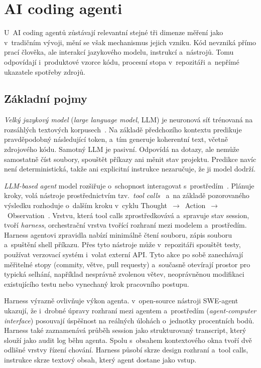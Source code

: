 \section{AI coding agenti}
\label{sec:ai-coding-agenti}

U~AI coding agentů zůstávají relevantní stejné tři dimenze měření jako
v~tradičním vývoji, mění se však mechanismus jejich vzniku. Kód nevzniká
přímo prací člověka, ale interakcí jazykového modelu, instrukcí
a~nástrojů. Tomu odpovídají i~produktové vzorce kódu, procesní stopa
v~repozitáři a~nepřímé ukazatele spotřeby zdrojů.

\subsection{Základní pojmy}
\label{sec:zakladni-pojmy}
\label{sec:typy-coding-agentu}

\textit{Velký jazykový model} (\textit{large language model}, LLM)
je neuronová síť trénovaná na rozsáhlých textových
korpusech~\cite{vaswani2017}. Na základě předchozího kontextu
predikuje pravděpodobný následující token, a~tím generuje koherentní
text, včetně zdrojového kódu. Samotný LLM je pasivní. Odpovídá
na dotazy, ale nemůže samostatně číst soubory, spouštět příkazy
ani měnit stav projektu. Predikce navíc není deterministická,
takže ani explicitní instrukce nezaručuje, že ji model dodrží.

\textit{LLM-based agent} model rozšiřuje o~schopnost interagovat
s~prostředím~\cite{liu2024llmagents}. Plánuje kroky, volá nástroje
prostřednictvím tzv.~\textit{tool calls}~\cite{schick2023toolformer}
a~na základě pozorovaného výsledku rozhoduje o~dalším kroku v~cyklu
Thought~$\to$~Action~$\to$~Observation~\cite{yao2022react}. Vrstvu,
která tool calls zprostředkovává a~spravuje stav session, tvoří
\textit{harness}, orchestrační vrstva tvořící rozhraní mezi modelem
a~prostředím.
Harness agentovi zpravidla nabízí minimálně čtení souboru, zápis souboru
a~spuštění shell příkazu. Přes tyto nástroje může v~repozitáři spouštět
testy, používat verzovací systém i~volat externí API. Tyto akce po sobě
zanechávají měřitelné stopy (commity, větve, pull requesty) a~současně
otevírají prostor pro typická selhání, například nesprávně zvolenou
větev, neoprávněnou modifikaci existujícího testu nebo vynechaný krok
pracovního postupu.

Harness výrazně ovlivňuje výkon agenta. \textcite{yang2024sweagent}
v~open-source nástroji SWE-agent ukazují, že i~drobné
úpravy rozhraní mezi agentem a~prostředím (\textit{agent-computer
interface}) posouvají úspěšnost na reálných úlohách o~jednotky
procentních bodů. Harness také zaznamenává průběh session jako
strukturovaný transcript, který slouží jako audit log běhu agenta.
Spolu s~obsahem kontextového okna tvoří dvě odlišné vrstvy řízení
chování. Harness působí skrze design rozhraní a~tool calls, instrukce
skrze textový obsah, který agent dostane jako vstup.

